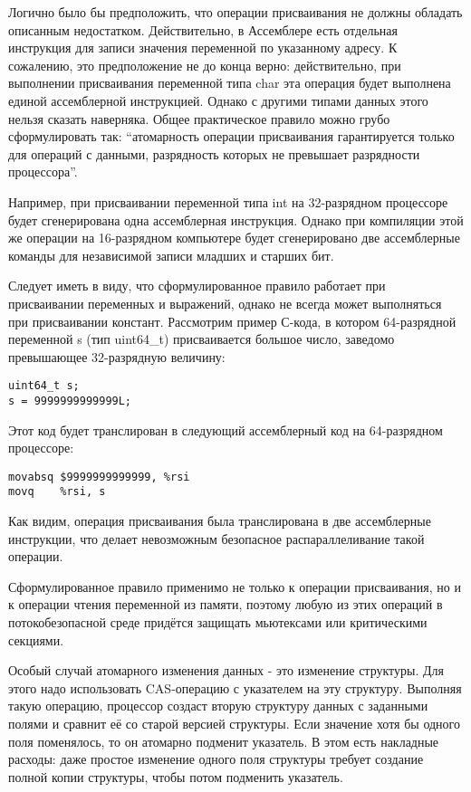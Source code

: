 Логично было бы предположить, что операции присваивания не должны обладать описанным недостатком. Действительно, в Ассемблере есть отдельная инструкция для записи значения переменной по указанному адресу. К сожалению, это предположение не до конца верно: действительно, при выполнении присваивания переменной типа char эта операция будет выполнена единой ассемблерной инструкцией. Однако с другими типами данных этого нельзя сказать наверняка. Общее практическое правило можно грубо сформулировать так: ``атомарность операции присваивания гарантируется только для операций с данными, разрядность которых не превышает разрядности процессора''. 

Например, при присваивании переменной типа int на 32-разрядном процессоре будет сгенерирована одна ассемблерная инструкция. Однако при компиляции этой же операции на 16-разрядном компьютере будет сгенерировано две ассемблерные команды для независимой записи младших и старших бит.

Следует иметь в виду, что сформулированное правило работает при присваивании переменных и выражений, однако не всегда может выполняться при присваивании констант. Рассмотрим пример С-кода, в котором 64-разрядной переменной s (тип uint64\_t) присваивается большое число, заведомо превышающее 32-разрядную величину:

\begin{verbatim}
uint64_t s;
s = 9999999999999L;
\end{verbatim}

Этот код будет транслирован в следующий ассемблерный код на 64-разрядном процессоре:

\begin{verbatim}
movabsq $9999999999999, %rsi
movq	%rsi, s
\end{verbatim}

Как видим, операция присваивания была транслирована в две ассемблерные инструкции, что делает невозможным безопасное распараллеливание такой операции.

Сформулированное правило применимо не только к операции присваивания, но и к операции чтения переменной из памяти, поэтому любую из этих операций в потокобезопасной среде придётся защищать мьютексами или критическими секциями.

Особый случай атомарного изменения данных - это изменение структуры. Для этого надо использовать CAS-операцию с указателем на эту структуру. Выполняя такую операцию, процессор создаст вторую структуру данных с заданными полями и сравнит её со старой версией структуры. Если значение хотя бы одного поля поменялось, то он атомарно подменит указатель. В этом есть накладные расходы: даже простое изменение одного поля структуры требует создание полной копии структуры, чтобы потом подменить указатель.

